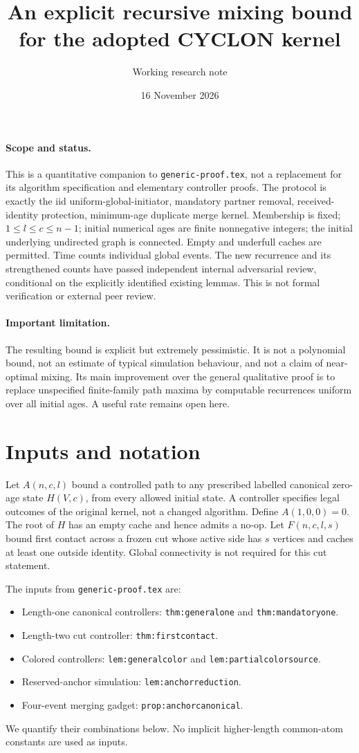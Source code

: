 \documentclass[11pt]{article}
\title{An explicit recursive mixing bound for the adopted CYCLON kernel}
\author{Working research note}
\date{16 November 2026}
\begin{document}
\maketitle
\paragraph{Scope and status.}
This is a quantitative companion to \texttt{generic-proof.tex}, not a
replacement for its algorithm specification and elementary controller proofs.
The protocol is exactly the iid uniform-global-initiator, mandatory partner
removal, received-identity protection, minimum-age duplicate merge kernel.
Membership is fixed; $1\le l\le c\le n-1$; initial numerical ages are finite
nonnegative integers; the initial underlying undirected graph is connected.
Empty and underfull caches are permitted. Time counts individual global events.
The new recurrence and its strengthened counts have passed independent internal
adversarial review, conditional on the explicitly identified existing lemmas.
This is not formal verification or external peer review.

\paragraph{Important limitation.}
The resulting bound is explicit but extremely pessimistic. It is not a
polynomial bound, not an estimate of typical simulation behaviour, and not a
claim of near-optimal mixing. Its main improvement over the general qualitative
proof is to replace unspecified finite-family path maxima by computable
recurrences uniform over all initial ages. A useful rate remains open here.

\section{Inputs and notation}
Let $A(n,c,l)$ bound a controlled path to any prescribed labelled canonical
zero-age state $H(V,c)$, from every allowed initial state. A controller specifies
legal outcomes of the original kernel, not a changed algorithm. Define
$A(1,0,0)=0$. The root of $H$ has an empty cache and hence admits a no-op.
Let $F(n,c,l,s)$ bound first contact across a frozen cut whose active side has
$s$ vertices and caches at least one outside identity. Global connectivity is
not required for this cut statement.

The inputs from \texttt{generic-proof.tex} are:
\begin{itemize}
\item Length-one canonical controllers: \texttt{thm:generalone} and
\texttt{thm:mandatoryone}.
\item Length-two cut controller: \texttt{thm:firstcontact}.
\item Colored controllers: \texttt{lem:generalcolor} and
\texttt{lem:partialcolorsource}.
\item Reserved-anchor simulation: \texttt{lem:anchorreduction}.
\item Four-event merging gadget: \texttt{prop:anchorcanonical}.
\end{itemize}
We quantify their combinations below.
No implicit higher-length common-atom constants are used as inputs.
\end{document}
